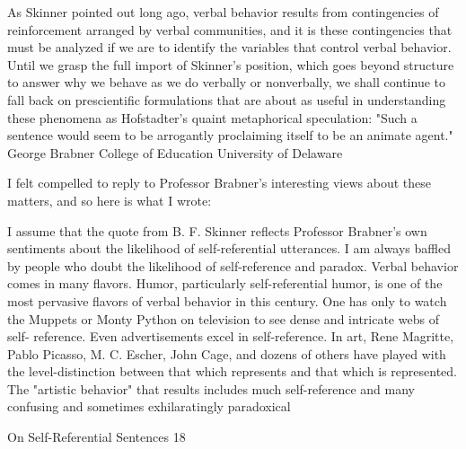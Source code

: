        As Skinner pointed out long ago, verbal behavior results from contingencies of
  reinforcement arranged by verbal communities, and it is these contingencies that
  must be analyzed if we are to identify the variables that control verbal behavior.
  Until we grasp the full import of Skinner's position, which goes beyond structure to
  answer why we behave as we do verbally or nonverbally, we shall continue to fall
  back on prescientific formulations that are about as useful in understanding these
  phenomena as Hofstadter's quaint metaphorical speculation: "Such a sentence
  would seem to be arrogantly proclaiming itself to be an animate agent."
                                                                      George Brabner
                                                                 College of Education
                                                               University of Delaware

I felt compelled to reply to Professor Brabner's interesting views about these matters, and
so here is what I wrote:

         I assume that the quote from B. F. Skinner reflects Professor Brabner's own
  sentiments about the likelihood of self-referential utterances. I am always baffled by
  people who doubt the likelihood of self-reference and paradox. Verbal behavior comes
  in many flavors. Humor, particularly self-referential humor, is one of the most
  pervasive flavors of verbal behavior in this century. One has only to watch the
  Muppets or Monty Python on television to see dense and intricate webs of self-
  reference. Even advertisements excel in self-reference.
         In art, Rene Magritte, Pablo Picasso, M. C. Escher, John Cage, and dozens of
  others have played with the level-distinction between that which represents and that
  which is represented. The "artistic behavior" that results includes much self-reference
  and many confusing and sometimes exhilaratingly paradoxical



On Self-Referential Sentences                                                              18

